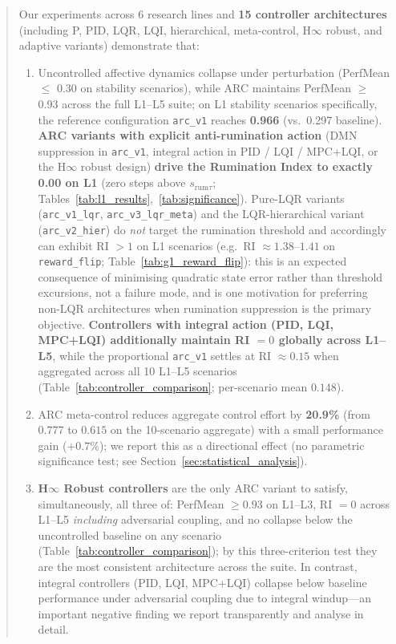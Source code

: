 \documentclass{article}
\begin{document}
\begin{abstract}
Our experiments across 6 research lines and \textbf{15 controller architectures} (including P, PID, LQR, LQI, hierarchical, meta-control, H$\infty$ robust, and adaptive variants) demonstrate that:
\begin{enumerate}
    \item Uncontrolled affective dynamics collapse under perturbation (PerfMean $\leq$ 0.30 on stability scenarios), while ARC maintains PerfMean $\geq$ 0.93 across the full L1--L5 suite; on L1 stability scenarios specifically, the reference configuration \texttt{arc\_v1} reaches \textbf{0.966} (vs.\ 0.297 baseline). \textbf{ARC variants with explicit anti-rumination action} (DMN suppression in \texttt{arc\_v1}, integral action in PID / LQI / MPC+LQI, or the H$\infty$ robust design) \textbf{drive the Rumination Index to exactly 0.00 on L1} (zero steps above $s_{\text{rum}\tau}$; Tables~\ref{tab:l1_results},~\ref{tab:significance}). Pure-LQR variants (\texttt{arc\_v1\_lqr}, \texttt{arc\_v3\_lqr\_meta}) and the LQR-hierarchical variant (\texttt{arc\_v2\_hier}) do \emph{not} target the rumination threshold and accordingly can exhibit RI $>1$ on L1 scenarios (e.g.\ RI $\approx 1.38$--$1.41$ on \texttt{reward\_flip}; Table~\ref{tab:g1_reward_flip}): this is an expected consequence of minimising quadratic state error rather than threshold excursions, not a failure mode, and is one motivation for preferring non-LQR architectures when rumination suppression is the primary objective. \textbf{Controllers with integral action (PID, LQI, MPC+LQI) additionally maintain RI $= 0$ globally across L1--L5}, while the proportional \texttt{arc\_v1} settles at RI $\approx 0.15$ when aggregated across all 10 L1--L5 scenarios (Table~\ref{tab:controller_comparison}; per-scenario mean $0.148$).
    \item ARC meta-control reduces aggregate control effort by \textbf{20.9\%} (from $0.777$ to $0.615$ on the 10-scenario aggregate) with a small performance gain ($+0.7\%$); we report this as a directional effect (no parametric significance test; see Section~\ref{sec:statistical_analysis}).
    \item \textbf{H$\infty$ Robust controllers} are the only ARC variant to satisfy, simultaneously, all three of: PerfMean $\geq 0.93$ on L1--L3, RI $= 0$ across L1--L5 \emph{including} adversarial coupling, and no collapse below the uncontrolled baseline on any scenario (Table~\ref{tab:controller_comparison}); by this three-criterion test they are the most consistent architecture across the suite. In contrast, integral controllers (PID, LQI, MPC+LQI) collapse below baseline performance under adversarial coupling due to integral windup---an important negative finding we report transparently and analyse in detail.

\end{enumerate}
\end{abstract}
\end{document}
